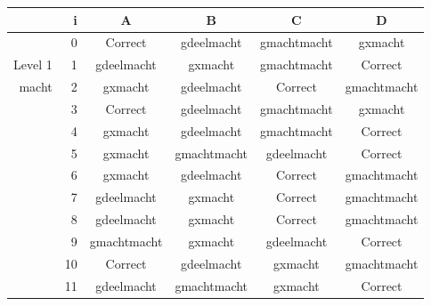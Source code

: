 \begin{tabular}{ rr| c|c|c|c}\hline\hline
     & i & \textbf{A} & \textbf{B} & \textbf{C} & \textbf{D}\\\hline

&0&Correct\cellcolor[gray]{0.6}&gdeelmacht&gmachtmacht&gxmacht\\
Level 1 & 1&gdeelmacht&gxmacht&gmachtmacht&Correct\cellcolor[gray]{0.6}\\
macht &2&gxmacht&gdeelmacht&Correct\cellcolor[gray]{0.6}&gmachtmacht\\
&3&Correct\cellcolor[gray]{0.6}&gdeelmacht&gmachtmacht&gxmacht\\
&4&gxmacht&gdeelmacht&gmachtmacht&Correct\cellcolor[gray]{0.6}\\
&5&gxmacht&gmachtmacht&gdeelmacht&Correct\cellcolor[gray]{0.6}\\
&6&gxmacht&gdeelmacht&Correct\cellcolor[gray]{0.6}&gmachtmacht\\
&7&gdeelmacht&gxmacht&Correct\cellcolor[gray]{0.6}&gmachtmacht\\
&8&gdeelmacht&gxmacht&Correct\cellcolor[gray]{0.6}&gmachtmacht\\
&9&gmachtmacht&gxmacht&gdeelmacht&Correct\cellcolor[gray]{0.6}\\
&10&Correct\cellcolor[gray]{0.6}&gdeelmacht&gxmacht&gmachtmacht\\
&11&gdeelmacht&gmachtmacht&gxmacht&Correct\cellcolor[gray]{0.6}\\
\hline\end{tabular}\par\ \newline

